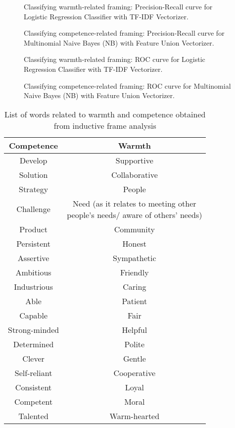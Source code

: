 \documentclass[jou]{apa7}
\begin{document}
\begin{figure*}
    \caption{Classifying warmth-related framing: Precision-Recall curve for Logistic Regression Classifier with TF-IDF Vectorizer.}
    \label{figure8}
    \end{figure*}

\begin{figure*}
    \caption{Classifying competence-related framing: Precision-Recall curve for Multinomial Naive Bayes (NB) with Feature Union Vectorizer.}
    \label{figure9}
    \end{figure*}

\begin{figure*}
    \caption{Classifying warmth-related framing: ROC curve for Logistic Regression Classifier with TF-IDF Vectorizer.}
    \label{figure10}
    \end{figure*}

\begin{figure*}
    \caption{Classifying competence-related framing: ROC curve for Multinomial Naive Bayes (NB) with Feature Union Vectorizer.}
    \label{figure11}
    \end{figure*}

\begin{table*}
    \centering
    \vspace*{2em}
    \caption{List of words related to warmth and competence obtained from inductive frame analysis}
    \label{table12}
    \vspace*{0.25em}
    \begin{tabular}[]{@{}cc@{}}
    \toprule
    Competence & Warmth\\
    \midrule
    Develop & Supportive\\
    Solution & Collaborative\\
    Strategy & People\\
    Challenge & \makecell[c]{Need (as it relates to meeting other\\people's needs/ aware of others’ needs)}\\
    Product & Community\\
    Persistent & Honest\\
    Assertive & Sympathetic\\
    Ambitious & Friendly\\
    Industrious & Caring\\
    Able & Patient\\
    Capable & Fair\\
    Strong-minded & Helpful\\
    Determined & Polite\\
    Clever & Gentle\\
    Self-reliant & Cooperative\\
    Consistent & Loyal\\
    Competent & Moral\\
    Talented & Warm-hearted\\
    \bottomrule
    \end{tabular}
    \end{table*}
\end{document}
